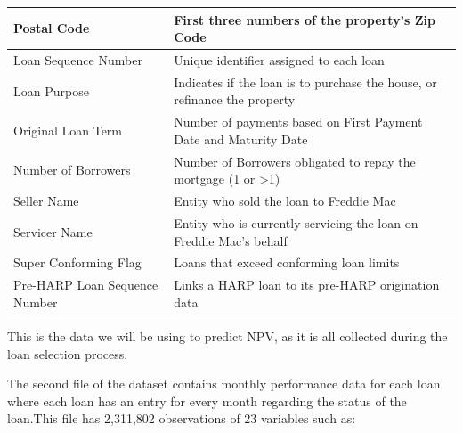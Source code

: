 \documentclass[12 pt]{uncw_thesis}
\theoremstyle{plain}
\theoremstyle{remark}
\theoremstyle{definition}
\begin{document}
\begin{center}
\begin{longtable}{ |M{5.5cm}|M{8.75cm}| }
		\hline
		Postal Code & First three numbers of the property's Zip Code\\
		\hline
		Loan Sequence Number & Unique identifier assigned to each loan \\
		\hline
		Loan Purpose & Indicates if the loan is to purchase the house, or refinance the property\\
		\hline
		Original Loan Term & Number of payments based on First Payment Date and Maturity Date \\
		\hline
		Number of Borrowers & Number of Borrowers obligated to repay the mortgage (1 or >1)\\
		\hline
		Seller Name & Entity who sold the loan to Freddie Mac\\
		\hline
		Servicer Name & Entity who is currently servicing the loan on Freddie Mac's behalf\\
		\hline
		Super Conforming Flag & Loans that exceed conforming loan limits\\
		\hline
		Pre-HARP Loan Sequence Number & Links a HARP loan to its pre-HARP origination data\\
		\hline
	\end{longtable}
\end{center}
\begin{flushleft}
This is the data we will be using to predict NPV, as it is all collected during the loan selection process.
\end{flushleft}
The second file of the dataset contains monthly performance data for each loan where each loan has an entry for every month regarding the status of the loan.This file has 2,311,802 observations of 23 variables such as:
\end{document}
